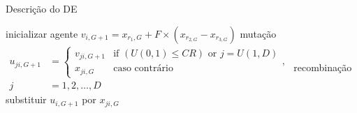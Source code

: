 \documentclass{article}
\begin{document}
\begin{algorithm}[!htbp] \centering
\caption{Descrição do DE}
\begin{algorithmic}[1]
    \State inicializar agente
\EndFor
\DoWhile
        \State $ v_{i, G + 1} = x_{r_{1}, G} + F \times (x_{r_{2, G}} - x_{r_{3, G}}) $
    \Comment mutação
        \State $
\begin{aligned}
u_{ji, G + 1} & =
\begin{cases}
    v_{ji, G + 1} & \text{if } (U(0, 1) \leq CR) \text{ or } j = U(1, D) \\
    x_{ji, G}     & \text{caso contrário}
\end{cases}, \\
j & = 1, 2, \dots, D
\end{aligned}
$
    \Comment recombinação
    \EndFor
        \State substituir $ u_{i, G + 1} $ por $ x_{ji, G} $
    \EndIf
{}
\end{algorithmic}
\label{alg:de}
\end{algorithm}
\end{document}
